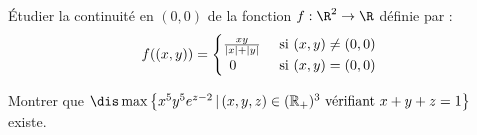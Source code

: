 \documentclass[a4paper,10pt]{report}
\begin{document}
\begin{Exercice}{} Étudier la continuité en $(0,0)$ de la fonction $f : \R^{2} \rightarrow \R$ définie par :
  \[
  f((x,y)) =
  \begin{cases}
    \frac{xy}{\vert x \vert + \vert y \vert} & \hbox{ si } (x,y) \neq (0,0) \\
    \, \; 0 & \hbox{ si } (x,y)=(0,0)
  \end{cases}
  \]
\end{Exercice}





\begin{Exercice}{} Montrer que $\dis \max \left\lbrace x^5y^5 e^{z-2} \, \vert \, (x,y,z) \in (\mathbb{R}_+)^3 \hbox{ vérifiant } x+y+z =1 \right\rbrace$ existe.
\end{Exercice}
\end{document}
